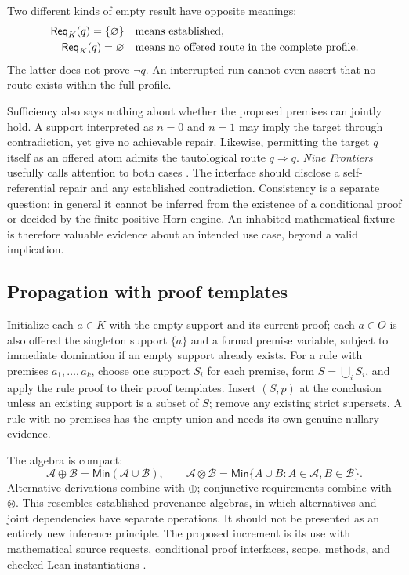 \documentclass[11pt,letterpaper]{article}
\newcommand{\Req}{\mathsf{Req}}\newcommand{\Cl}{\mathsf{Cl}}
\newcommand{\Min}{\mathsf{Min}}\newcommand{\obs}{\mathsf{obs}}
\theoremstyle{definition}\newtheorem{definition}[proposition]{Definition}
\theoremstyle{remark}\newtheorem{remark}[proposition]{Remark}
\begin{document}
Two different kinds of empty result have opposite meanings:
\begin{align*}
 \Req_K(q)=\{\varnothing\}&\quad\hbox{means established},\\
 \Req_K(q)=\varnothing&\quad\hbox{means no offered route in the complete profile}.
\end{align*}
The latter does not prove $\neg q$. An interrupted run cannot even assert that
no route exists within the full profile.

Sufficiency also says nothing about whether the proposed premises can jointly
hold. A support interpreted as $n=0$ and $n=1$ may imply the target through
contradiction, yet give no achievable repair. Likewise, permitting the target
$q$ itself as an offered atom admits the tautological route $q\Rightarrow q$.
\emph{Nine Frontiers} usefully calls attention to both cases
\cite{parallel-r4}. The interface should disclose a self-referential repair and
any established contradiction. Consistency is a separate question: in general
it cannot be inferred from the existence of a conditional proof or decided by
the finite positive Horn engine. An inhabited mathematical fixture is therefore
valuable evidence about an intended use case, beyond a valid implication.

\subsection{Propagation with proof templates}

Initialize each $a\in K$ with the empty support and its current proof; each
$a\in O$ is also offered the singleton support $\{a\}$ and a formal premise
variable, subject to immediate domination if an empty support already exists.
For a rule with premises $a_1,\ldots,a_k$, choose one support $S_i$ for each
premise, form $S=\bigcup_iS_i$, and apply the rule proof to their proof
templates. Insert $(S,p)$ at the conclusion unless an existing support is a
subset of $S$; remove any existing strict supersets. A rule with no premises
has the empty union and needs its own genuine nullary evidence.

The algebra is compact:
\[
 \mathcal A\oplus\mathcal B=\Min(\mathcal A\cup\mathcal B),\qquad
 \mathcal A\otimes\mathcal B=\Min\{A\cup B:A\in\mathcal A,B\in\mathcal B\}.
\]
Alternative derivations combine with $\oplus$; conjunctive requirements combine
with $\otimes$. This resembles established provenance algebras, in which
alternatives and joint dependencies have separate operations. It should not
be presented as an entirely new inference principle. The proposed increment
is its use with mathematical source requests, conditional proof interfaces,
scope, methods, and checked Lean instantiations \cite{provenance,bryony}.
\end{document}
